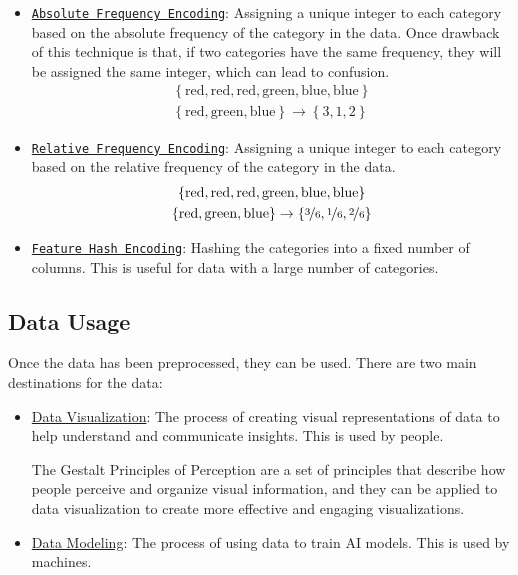 \begin{itemize}
    \item \ul{\texttt{Absolute Frequency Encoding}}: Assigning a unique integer to each category based on the absolute frequency of the category in the data. Once drawback of this technique is that, if two categories have the same frequency, they will be assigned the same integer, which can lead to confusion.
    \begin{gather*}
        \left\{\text{red}, \text{red}, \text{red}, \text{green}, \text{blue}, \text{blue}\right\}\\ \left\{\text{red}, \text{green}, \text{blue}\right\} \rightarrow \left\{3, 1, 2\right\}
    \end{gather*}

    \item \ul{\texttt{Relative Frequency Encoding}}: Assigning a unique integer to each category based on the relative frequency of the category in the data.
    \begin{gather*}
        \left\{\text{red}, \text{red}, \text{red}, \text{green}, \text{blue}, \text{blue}\right\}\\ \left\{\text{red}, \text{green}, \text{blue}\right\} \rightarrow \left\{\nicefrac{3}{6}, \nicefrac{1}{6}, \nicefrac{2}{6}\right\}
    \end{gather*}

    \item \ul{\texttt{Feature Hash Encoding}}: Hashing the categories into a fixed number of columns. This is useful for data with a large number of categories.
\end{itemize}

\subsection{Data Usage}

Once the data has been preprocessed, they can be used. There are two main destinations for the data:
\begin{itemize}
    \item \ul{Data Visualization}: The process of creating visual representations of data to help understand and communicate insights. This is used by people.
    
    The Gestalt Principles of Perception are a set of principles that describe how people perceive and organize visual information, and they can be applied to data visualization to create more effective and engaging visualizations.
    \item \ul{Data Modeling}: The process of using data to train AI models. This is used by machines.
\end{itemize}